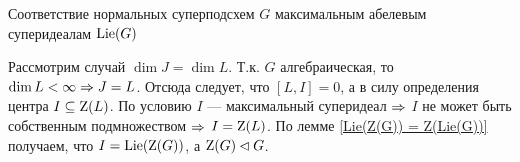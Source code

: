 \begin{subsection}{Соответствие нормальных суперподсхем $ G $
                   максимальным абелевым суперидеалам $ \mathrm{Lie}(G) $ }
\begin{theorem}
{      Рассмотрим случай $ \dim J = \dim L $.
      Т.к. $ G $ алгебраическая, то $ \dim L < \infty \Rightarrow J = L $.
      Отсюда следует, что $ [L, I] = 0 $, а в силу определения центра $ I \subseteq \mathrm{Z}(L) $.
      По условию $ I $ --- максимальный суперидеал $ \Rightarrow $ $ I $ не может быть
      собственным подмножеством $ \Rightarrow $ $ I = \mathrm{Z}(L) $.
      По лемме \ref{Lie(Z(G)) = Z(Lie(G))} получаем, что $ I = \mathrm{Lie}(\mathrm{Z}(G)) $, а $ \mathrm{Z}(G) \lhd G $.
    \qedhere
    }
  \end{theorem}

\end{subsection}
